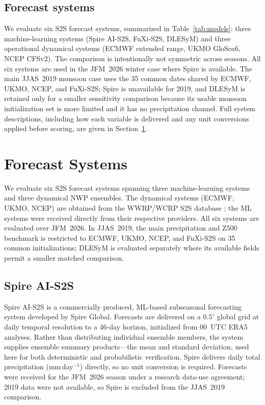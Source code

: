 \documentclass[11pt,a4paper]{article}
\begin{document}
\subsection{Forecast systems}\label{sec:models_data}

We evaluate six S2S forecast systems, summarized in Table~\ref{tab:models}:
three machine-learning systems (Spire AI-S2S, FuXi-S2S, DLESyM) and three
operational dynamical systems (ECMWF extended range, UKMO GloSea6, NCEP
CFSv2). The comparison is intentionally not symmetric across seasons. All six
systems are used in the JFM~2026 winter case where Spire is available. The main
JJAS~2019 monsoon case uses the 35 common dates shared by ECMWF, UKMO, NCEP,
and FuXi-S2S; Spire is unavailable for 2019, and DLESyM is retained only for a
smaller sensitivity comparison because its usable monsoon initialization set is
more limited and it has no precipitation channel. Full system descriptions,
including how each variable is delivered and any unit conversions applied
before scoring, are given in Section~\ref{sec:models}.


\section{Forecast Systems}\label{sec:models}

We evaluate six S2S forecast systems spanning three machine-learning systems
and three dynamical NWP ensembles. The dynamical systems (ECMWF, UKMO, NCEP)
are obtained from the WWRP/WCRP S2S database \citep{vitart2017}; the ML
systems were received directly from their respective providers. All six
systems are evaluated over JFM~2026. In JJAS~2019, the main precipitation and
Z500 benchmark is restricted to ECMWF, UKMO, NCEP, and FuXi-S2S on 35 common
initializations; DLESyM is evaluated separately where its available fields
permit a smaller matched comparison.

\subsection{Spire AI-S2S}\label{sec:spire}

Spire AI-S2S \citep{spire2026} is a commercially produced, ML-based
subseasonal forecasting system developed by Spire Global. Forecasts are
delivered on a $0.5^{\circ}$ global grid at daily temporal resolution to a
46-day horizon, initialized from 00~UTC ERA5 analyses. Rather than
distributing individual ensemble members, the system supplies ensemble
summary products---the mean and standard deviation, used here for both
deterministic and probabilistic verification. Spire delivers daily total
precipitation (mm\,day$^{-1}$) directly, so no unit conversion is required.
Forecasts were received for the JFM~2026 season under a research data-use
agreement; 2019 data were not available, so Spire is excluded from the
JJAS~2019 comparison.
\end{document}

